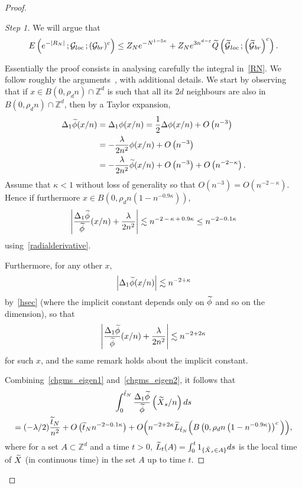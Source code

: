 \documentclass[AHL, Unicode, longabstracts, published]{cedram}
\newenvironment{step}[1]{\begin{proof}[#1]}{\let\qed\relax\end{proof}}
\newcommand*\Z {{\mathbb Z}}
\newcommand*\E {{E}}
\newcommand{\cG}{\mathcal{G}}
\newcommand*\Q{{Q}}
\newcommand*\eps{\varepsilon}
\let\oldtilde\tilde
\renewcommand*{\tilde}[1]{\mathchoice{\widetilde{#1}}{\widetilde{#1}}{\oldtilde{#1}}{\oldtilde{#1}}}\let\oldhat\hat
\renewcommand*{\hat}[1]{\mathchoice{\widehat{#1}}{\widehat{#1}}{\oldhat{#1}}{\oldhat{#1}}}\let\oldexists\exists
\renewcommand*{\exists}{\mathrel{\oldexists}}
\begin{document}
\begin{proof}
\begin{step}{Step 1} We will argue that
\begin{equation}\label{step1}
\E\left(e^{- |R_N|}\,; \cG_{loc}\,; (\cG_{br})^c\right) \le Z_N e^{- N^{1- 5 \kappa}} + Z_N e^{3 n^{d- \eps}} \tilde \Q\left(\tilde \cG_{loc}\,; \left(\tilde \cG_{br}\right)^c\right).
\end{equation}



Essentially the proof consists in analysing carefully the integral in~\eqref{RN}. We follow roughly the arguments~\cite[see equations~(4.3) and (4.4)]{BO}, with additional details. We start by observing that if $x \in B(0, \rho_d n) \cap \Z^d$ is such that all its $2d$ neighbours are also in $B(0, \rho_d n) \cap \Z^d$, then by a Taylor expansion,
\begin{align*}
\Delta_1 \tilde \phi (x/n) &= \Delta_1 \phi(x/n) = \frac12 \Delta \phi(x/n) + O\left(n^{-3}\right) \\
& = - \frac{\lambda}{2n^2} \phi (x/n) + O \left(n^{ - 3}\right)\\
& = - \frac{\lambda}{2n^2} \tilde \phi (x/n) + O \left(n^{- 3}\right) + O\left(n^{ - 2 - \kappa}\right).
\end{align*}
Assume that $\kappa <1$ without loss of generality so that $O(n^{-3}) = O (n^{ - 2 - \kappa})$. Hence if furthermore $x \in B(0, \rho_d n(1- n^{ - 0.9\kappa}))$,
\begin{equation}\label{chgms_eigen1}
\left| \frac{\Delta_1 \tilde \phi}{\tilde \phi} (x/n) + \frac{\lambda}{2n^2} \right | \lesssim n^{-2\,-\,\kappa\,+\,0.9\kappa} \le n^{ - 2 - 0.1 \kappa}
\end{equation}
using~\eqref{radialderivative}.

Furthermore, for any other $x$,
\[
\left|\Delta_1 \tilde \phi (x/n)\right| \lesssim n^{ - 2 + \kappa}
\]
by~\eqref{hsec} (where the implicit constant depends only on $\tilde \phi$ and so on the dimension), so that
\begin{equation}\label{chgms_eigen2}
\left| \frac{\Delta_1 \tilde \phi}{\tilde \phi} (x/n) + \frac{\lambda}{2n^2} \right| \lesssim n^{-2+ 2\kappa}
\end{equation}
for such $x$, and the same remark holds about the implicit constant.

Combining~\eqref{chgms_eigen1} and~\eqref{chgms_eigen2}, it follows that
\begin{multline}\label{chgmeas_int}
\int_0^{\tilde t_N} \frac{\Delta_1 \tilde \phi}{\tilde \phi}\left(\tilde X_s/n\right)ds \\ 
=(- \lambda/2)\frac{{\tilde t_N}}{n^2} + O \left(\tilde t_N n^{-2 -0.1 \kappa}\right) + O \Big(n^{-2 + 2\kappa}\tilde L_{\tilde t_N} \Big(B\left(0, \rho_d n\left(1- n^{ - 0.9 \kappa}\right)\right)^c\Big)\Big),
\end{multline}
where for a set $A \subset \Z^d$ and a time $t>0$, $\tilde L_t(A) = \int_0^t 1_{\{ \tilde X_s \in A\}} ds$ is the local time of $\tilde X$ (in continuous time) in the set $A$ up to time $t$.


\end{step}
\end{proof}
\end{document}
